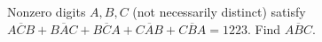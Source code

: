 Nonzero digits $A,B,C$ (not necessarily distinct) satisfy $\overline{ACB}+\overline{BAC}+\overline{BCA}+\overline{CAB}+\overline{CBA}=1223$. Find $\overline{ABC}$.
